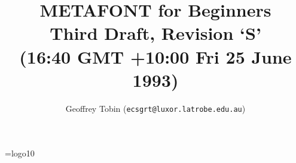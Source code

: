 %


\oddsidemargin=0in
\evensidemargin=0in
\marginparwidth=0in
\marginparsep=0in


\textwidth=6.25in


\addtolength{\textheight}{\topmargin}
\topmargin=0in
\addtolength{\textheight}{0.4in}

\font\mf=logo10
\hyphenchar{}
\newcommand{\MF}{{\mf META\discretionary{}{}{}FONT\/}}
\newcommand{\MFbook}{{\sl The \MF{}book\/}}
\newcommand{\TeXbook}{{\sl The \TeX{}book\/}}
\newcommand{\ttbsl}{{\tt \char`\\\/}}  %

\title{%
  \vspace*{-1in}%
  METAFONT for Beginners\\%
  {\normalsize Third Draft, Revision `S'}\\%
  {\normalsize (16:40 GMT +10:00 Fri 25 June 1993)}%
}

\date{}

\author{Geoffrey {\sc Tobin} ({\tt ecsgrt@luxor.latrobe.edu.au})}



\maketitle

\tableofcontents

\newpage


